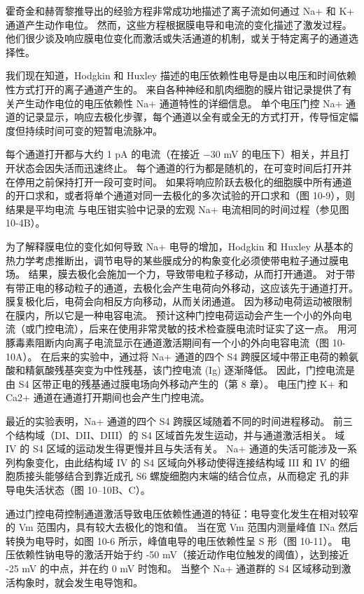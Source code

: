 霍奇金和赫胥黎推导出的经验方程非常成功地描述了离子流如何通过 Na+ 和 K+ 通道产生动作电位。 
然而，这些方程根据膜电导和电流的变化描述了激发过程。 
他们很少谈及响应膜电位变化而激活或失活通道的机制，或关于特定离子的通道选择性。


我们现在知道，Hodgkin 和 Huxley 描述的电压依赖性电导是由以电压和时间依赖性方式打开的离子通道产生的。 
来自各种神经和肌肉细胞的膜片钳记录提供了有关产生动作电位的电压依赖性 Na+ 通道特性的详细信息。 
单个电压门控 Na+ 通道的记录显示，响应去极化步骤，每个通道以全有或全无的方式打开，传导恒定幅度但持续时间可变的短暂电流脉冲。


每个通道打开都与大约 1 pA 的电流（在接近 −30 mV 的电压下）相关，并且打开状态会因失活而迅速终止。 
每个通道的行为都是随机的，在可变时间后打开并在停用之前保持打开一段可变时间。 
如果将响应阶跃去极化的细胞膜中所有通道的开口求和，或者将单个通道对同一去极化的多次试验的开口求和（图 10-9），则结果是平均电流 与电压钳实验中记录的宏观 Na+ 电流相同的时间过程（参见图 10-4B）。


为了解释膜电位的变化如何导致 Na+ 电导的增加，Hodgkin 和 Huxley 从基本的热力学考虑推断出，调节电导的某些膜成分的构象变化必须使带电粒子通过膜电场。 
结果，膜去极化会施加一个力，导致带电粒子移动，从而打开通道。 
对于带有带正电的移动粒子的通道，去极化会产生电荷向外移动，这应该先于通道打开。 
膜复极化后，电荷会向相反方向移动，从而关闭通道。 
因为移动电荷运动被限制在膜内，所以它是一种电容电流。 
预计这种门控电荷运动会产生一个小的外向电流（或门控电流），后来在使用非常灵敏的技术检查膜电流时证实了这一点。 
用河豚毒素阻断内向离子电流显示在通道激活期间有一个小的外向电容电流（图 10-10A）。 
在后来的实验中，通过将 Na+ 通道的四个 S4 跨膜区域中带正电荷的赖氨酸和精氨酸残基突变为中性残基，该门控电流 (Ig) 逐渐降低。 
因此，门控电流是由 S4 区带正电的残基通过膜电场向外移动产生的（第 8 章）。 
电压门控 K+ 和 Ca2+ 通道在通道打开期间也会产生门控电流。


最近的实验表明，Na+ 通道的四个 S4 跨膜区域随着不同的时间进程移动。 
前三个结构域（DI、DII、DIII）的 S4 区域首先发生运动，并与通道激活相关。 
域 IV 的 S4 区域的运动发生得更慢并且与失活有关。 
Na+ 通道的失活可能涉及一系列构象变化，由此结构域 IV 的 S4 区域向外移动使得连接结构域 III 和 IV 的细胞质接头能够结合到靠近成孔 S6 螺旋细胞内末端的结合位点，从而稳定 孔的非导电失活状态（图 10–10B、C）。


通过门控电荷控制通道激活导致电压依赖性通道的特征：电导变化发生在相对较窄的 Vm 范围内，具有较大去极化的饱和值。 
当在宽 Vm 范围内测量峰值 INa 然后转换为电导时，如图 10-6 所示，峰值电导的电压依赖性呈 S 形（图 10-11）。 
电压依赖性钠电导的激活开始于约 -50 mV（接近动作电位触发的阈值），达到接近 -25 mV 的中点，并在约 0 mV 时饱和。 
当整个 Na+ 通道群的 S4 区域移动到激活构象时，就会发生电导饱和。


